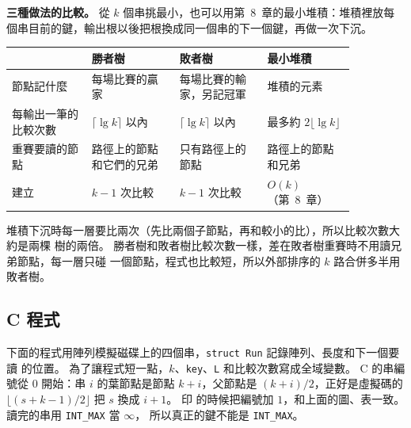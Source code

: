 \textbf{三種做法的比較。} 從 $k$ 個串挑最小，也可以用第~8~章的最小堆積：堆積裡放每
個串目前的鍵，輸出根以後把根換成同一個串的下一個鍵，再做一次下沉。

\begin{center}
\begin{tabular}{p{0.2\linewidth}p{0.22\linewidth}p{0.22\linewidth}p{0.22\linewidth}}
\toprule
 & 勝者樹 & 敗者樹 & 最小堆積 \\
\midrule
節點記什麼 & 每場比賽的贏家 & 每場比賽的輸家，另記冠軍 & 堆積的元素 \\
每輸出一筆的比較次數 & $\lceil \lg k \rceil$ 以內 & $\lceil \lg k \rceil$ 以內 & 最多約 $2\lfloor \lg k \rfloor$ \\
重賽要讀的節點 & 路徑上的節點和它們的兄弟 & 只有路徑上的節點 & 路徑上的節點和兄弟 \\
建立 & $k - 1$ 次比較 & $k - 1$ 次比較 & $O(k)$（第~8~章） \\
\bottomrule
\end{tabular}
\end{center}

堆積下沉時每一層要比兩次（先比兩個子節點，再和較小的比），所以比較次數大約是兩棵
樹的兩倍。 勝者樹和敗者樹比較次數一樣，差在敗者樹重賽時不用讀兄弟節點，每一層只碰
一個節點，程式也比較短，所以外部排序的 $k$ 路合併多半用敗者樹。

\subsection{C 程式}

下面的程式用陣列模擬磁碟上的四個串，\texttt{struct Run} 記錄陣列、長度和下一個要讀
的位置。 為了讓程式短一點，$k$、\texttt{key}、\texttt{L} 和比較次數寫成全域變數。 C 的串編號從 $0$ 開始：串 $i$ 的葉節點是節點 $k + i$，父節點是
$(k + i)/2$，正好是虛擬碼的 $\lfloor (s + k - 1)/2 \rfloor$ 把 $s$ 換成 $i + 1$。 印
的時候把編號加 $1$，和上面的圖、表一致。 讀完的串用 \texttt{INT\_MAX} 當 $\infty$，
所以真正的鍵不能是 \texttt{INT\_MAX}。

